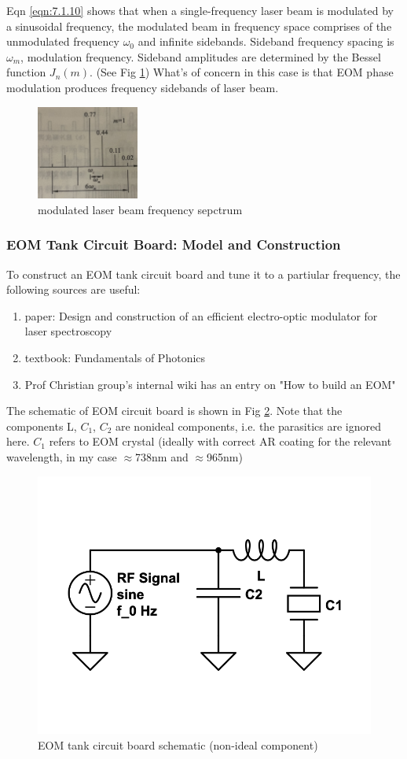 \documentclass[11pt,A4Paper]{article}
\begin{document}
Eqn \ref{eqn:7.1.10} shows that when a single-frequency laser beam is modulated by a sinusoidal frequency, the modulated beam in frequency space comprises of the unmodulated frequency $\omega_0$ and infinite sidebands. Sideband frequency spacing is $\omega_m$, modulation frequency. 
Sideband amplitudes are determined by the Bessel function $J_n(m)$. (See Fig \ref{fig:EOMsidebandTheory}) What's of concern in this case is that EOM phase modulation produces frequency sidebands of laser beam. 

\begin{figure}[H]
    \centering
    \includegraphics[width=0.3\textwidth]{EOMsidebandTheory.png}
    \caption{modulated laser beam frequency sepctrum}
    \label{fig:EOMsidebandTheory}
\end{figure}

 \subsubsection{EOM Tank Circuit Board: Model and Construction}
To construct an EOM tank circuit board and tune it to a partiular frequency, the following sources are useful: 
\begin{enumerate}
    \item paper: Design and construction of an efficient electro-optic modulator for laser spectroscopy\cite{20MHzEOM}
    \item textbook: Fundamentals of Photonics\cite{fundamentalsOfPhotonics}
    \item Prof Christian group's internal wiki has an entry on "How to build an EOM"
\end{enumerate}
The schematic of EOM circuit board is shown in Fig \ref{fig:eom-tank-cirucuit1}. Note that the components L, $C_1$, $C_2$ are nonideal components, i.e. the parasitics are ignored here.
$C_1$ refers to EOM crystal (ideally with correct AR coating for the relevant wavelength, in my case $\approx$738nm and $\approx$965nm)

\begin{figure}[h]
    \centering
    \includegraphics[width=.5\textwidth]{eom-tank-cirucuit1.png}
    \caption{EOM tank circuit board schematic (non-ideal component)}
    \label{fig:eom-tank-cirucuit1}
\end{figure}
\end{document}
